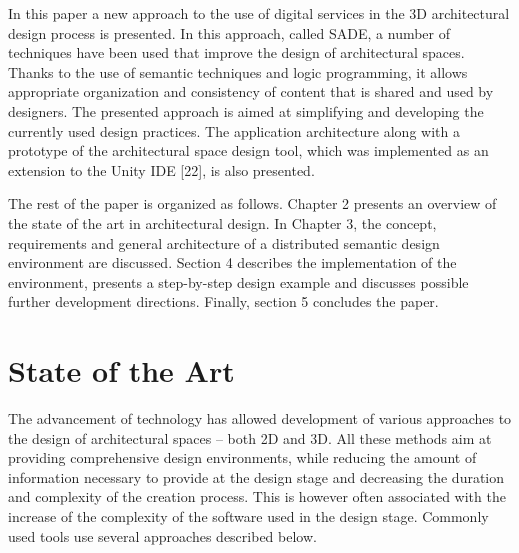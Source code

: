 \documentclass[runningheads]{llncs}
\begin{document}
In this paper a new approach to the use of digital services in the 3D architectural design process is presented. In this approach, called SADE, a number of techniques have been used that improve the design of architectural spaces. Thanks to the use of semantic techniques and logic programming, it allows appropriate organization and consistency of content that is shared and used by designers. The presented approach is aimed at simplifying and developing the currently used design practices. The application architecture along with a prototype of the architectural space design tool, which was implemented as an extension to the Unity IDE [22], is also presented.

The rest of the paper is organized as follows. Chapter 2 presents an overview of the state of the art in architectural design. In Chapter 3, the concept, requirements and general architecture of a distributed semantic design environment are discussed. Section 4 describes the implementation of the environment, presents a step-by-step design example and discusses possible further development directions. Finally, section 5 concludes the paper.

\section{State of the Art}
The advancement of technology has allowed development of various approaches to the design of architectural spaces -- both 2D and 3D. All these methods aim at providing comprehensive design environments, while reducing the amount of information necessary to provide at the design stage and decreasing the duration and complexity of the creation process. This is however often associated with the increase of the complexity of the software used in the design stage. Commonly used tools use several approaches described below.
\end{document}
